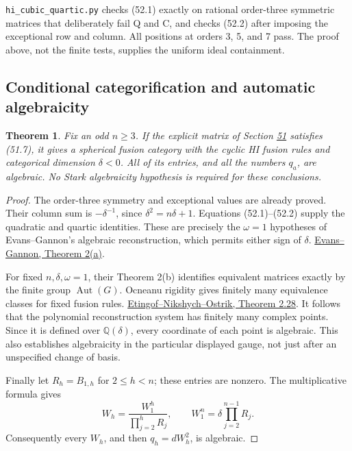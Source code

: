 \documentclass[11pt,reqno]{amsart}
\theoremstyle{plain}
\newtheorem{theorem}{Theorem}[section]
\begin{document}
\texttt{hi\_\allowbreak cubic\_\allowbreak quartic.py} checks (52.1) exactly on rational order-three
symmetric matrices that deliberately fail Q and C, and checks (52.2)
after imposing the exceptional row and column. All positions at orders
3, 5, and 7 pass. The proof above, not the finite tests, supplies the
uniform ideal containment.

\subsection{Conditional categorification and automatic algebraicity}\label{sec:52.2}

\begin{theorem}
Fix an odd \(n\ge3\). If the explicit matrix of Section \hyperref[sec:51]{51}
satisfies (51.7), it gives a spherical fusion category with the cyclic
HI fusion rules and categorical dimension \(\delta<0\). All of its
entries, and all the numbers \(q_a\), are algebraic. No Stark
algebraicity hypothesis is required for these conclusions.
\end{theorem}

\begin{proof}
The order-three symmetry and exceptional values are already
proved. Their column sum is \(-\delta^{-1}\), since
\(\delta^2=n\delta+1\). Equations (52.1)--(52.2) supply the quadratic
and quartic identities. These are precisely the \(\omega=1\) hypotheses
of Evans--Gannon's algebraic reconstruction, which permits either sign
of \(\delta\). \href{https://arxiv.org/pdf/1506.03546}{Evans--Gannon, Theorem 2(a)}.

For fixed \(n,\delta,\omega=1\), their Theorem 2(b) identifies
equivalent matrices exactly by the finite group \(\operatorname{Aut}(G)\).
Ocneanu rigidity gives finitely many equivalence classes for fixed
fusion rules. \href{https://annals.math.princeton.edu/wp-content/uploads/annals-v162-n2-p01.pdf}{Etingof--Nikshych--Ostrik, Theorem 2.28}.
It follows that the polynomial reconstruction system has finitely
many complex points. Since it is defined over \(\mathbb Q(\delta)\),
every coordinate of each point is algebraic. This also establishes
algebraicity in the particular displayed gauge, not just after an
unspecified change of basis.

Finally let \(R_h=B_{1,h}\) for \(2\le h<n\); these entries are
nonzero. The multiplicative formula gives
\[
 W_h=\frac{W_1^h}{\prod_{j=2}^hR_j},\qquad
 W_1^n=\delta\prod_{j=2}^{n-1}R_j.
\]
Consequently every \(W_h\), and then \(q_h=dW_h^2\), is algebraic.
\end{proof}
\end{document}

